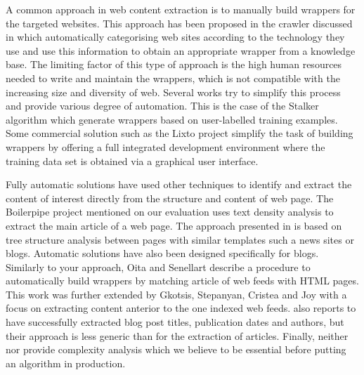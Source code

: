 A common approach in web content extraction is to manually build wrappers for the targeted websites. This approach has been proposed in the crawler discussed in \cite{faheem2012intelligent} which automatically categorising web sites according to the technology they use and use this information to obtain an appropriate wrapper from a knowledge base. The limiting factor of this type of approach is the high human resources needed to write and maintain the wrappers, which is not compatible with the increasing size and diversity of web. Several works try to simplify this process and provide various degree of automation. This is the case of the Stalker algorithm \cite{stalker} which generate wrappers based on user-labelled training examples. Some commercial solution such as the Lixto project \cite{lixto} simplify the task of building wrappers by offering a full integrated development environment where the training data set is obtained via a graphical user interface.

Fully automatic solutions have used other techniques to identify and extract the content of interest directly from the structure and content of web page. The Boilerpipe project \cite{kohlschuetter2010} mentioned on our evaluation uses text density analysis to extract the main article of a web page. The approach presented in \cite{treeedit} is based on tree structure analysis between pages with similar templates such a news sites or blogs. Automatic solutions have also been designed specifically for blogs. Similarly to your approach, Oita and Senellart \cite{oita2010} describe a procedure to automatically build wrappers by matching article of web feeds with HTML pages. This work was further extended by Gkotsis, Stepanyan, Cristea and Joy \cite{gkotsis2013} with a focus on extracting content anterior to the one indexed web feeds. \cite{gkotsis2013} also reports to have successfully extracted blog post titles, publication dates and authors, but their approach is less generic than for the extraction of articles. Finally, neither \cite{oita2010} nor \cite{gkotsis2013} provide complexity analysis which we believe to be essential before putting an algorithm in production.
